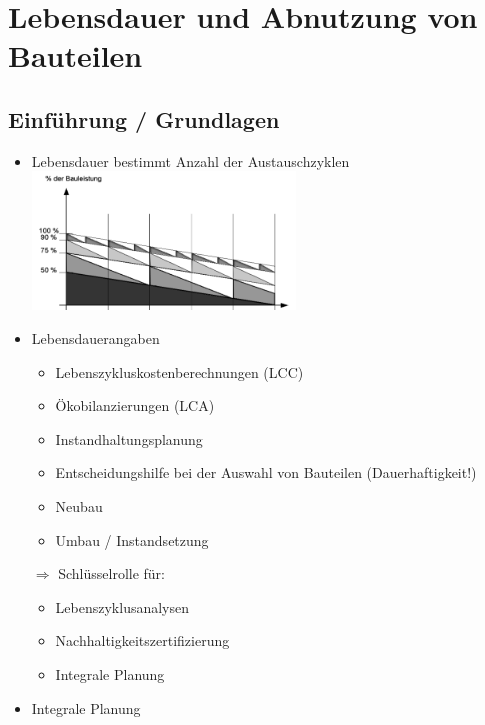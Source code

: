 \documentclass[fleqn,twoside,dvipsnames]{article}
\begin{document}
    
\section{Lebensdauer und Abnutzung von Bauteilen} \label{Nutzungs/Lebensdauer}

    \subsection{Einführung / Grundlagen}
        \begin{itemize}
            \item Lebensdauer bestimmt Anzahl der Austauschzyklen\\
                \includegraphics[width=0.55\textwidth]{Grafiken/Lebensdauer und Abnutzung von Bauteilen/Lebensdauer Austauschzyklen.png}
            \item Lebensdauerangaben
                \begin{itemize}
                    \item Lebenszykluskostenberechnungen (LCC)
                    \item Ökobilanzierungen (LCA)
                    \item Instandhaltungsplanung
                    \item Entscheidungshilfe bei der Auswahl von Bauteilen (Dauerhaftigkeit!)
                    \item Neubau
                    \item Umbau / Instandsetzung
                \end{itemize}
                $\Rightarrow$ Schlüsselrolle für:
                    \begin{itemize}
                        \item Lebenszyklusanalysen
                        \item Nachhaltigkeitszertifizierung
                        \item Integrale Planung
                    \end{itemize}
            \item Integrale Planung\\

\end{itemize}
\end{document}
